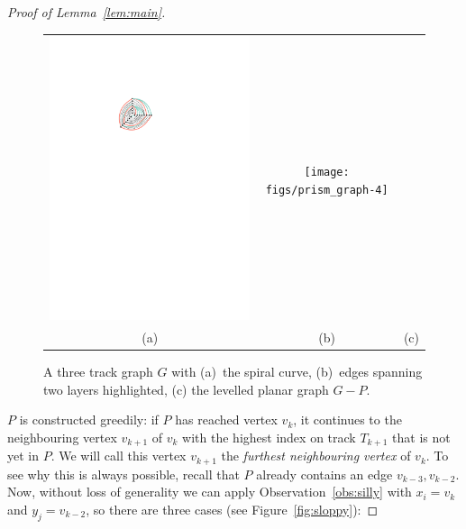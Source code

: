 \documentclass{jgaa-art}
\newcommand{\figlabel}[1]{\label{fig:#1}}
\newcommand{\figref}[1]{\mbox{Figure~\ref{fig:#1}}}
\newcommand{\lemref}[1]{Lemma~\ref{lem:#1}}
\newcommand{\obsref}[1]{Observation~\ref{obs:#1}}
\begin{document}
\begin{proof}[Proof of \lemref{main}]
\begin{figure}
\begin{center}
\begin{tabular}{ccc}
  \includegraphics{figs/prism_graph-3} &
  \texttt{[image: figs/prism\_graph-4]} \\
  (a) & (b) & (c)
\end{tabular}%
  \end{center}
  \caption{A three track graph $G$ with (a)~the spiral curve, (b)~edges spanning two layers highlighted, (c) the levelled planar graph $G-P$.}
  \figlabel{graph-path}
  \end{figure}

  $P$ is constructed greedily: if $P$ has reached vertex $v_k$, it continues to the neighbouring vertex
  $v_{k+1}$ of $v_{k}$ with the highest index on track $T_{k+1}$ that is not yet in $P$.
  We will call this vertex $v_{k+1}$ the \emph{furthest neighbouring vertex} of $v_k$.  To see why this is always possible,
  recall that $P$ already contains an edge $v_{k-3},v_{k-2}$. Now, without loss of generality we can
  apply \obsref{silly} with $x_i=v_k$ and $y_j=v_{k-2}$, so there
  are three cases (see \figref{sloppy}):


\end{proof}
\end{document}
